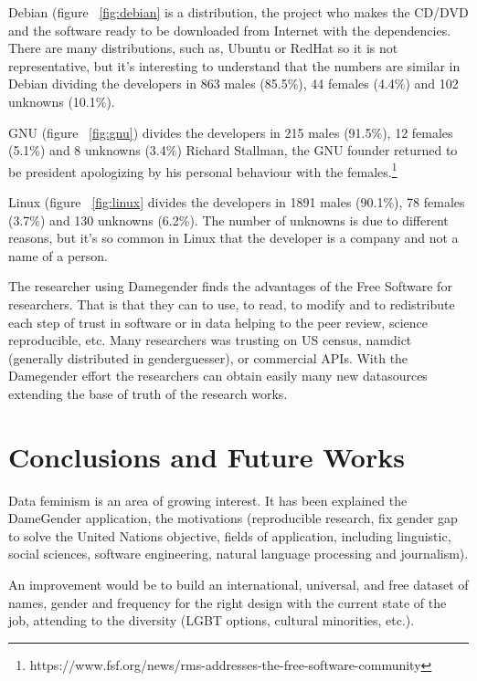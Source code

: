 \documentclass[a4paper]{article}
\begin{document}
Debian (figure ~\ref{fig:debian} is a distribution, the
project who makes the CD/DVD and the software ready to be
downloaded from Internet with the dependencies. There are
many distributions, such as, Ubuntu or RedHat
so it is not representative, but it's interesting to understand that
the numbers are similar in Debian dividing the developers in 863 males
(85.5\%), 44 females (4.4\%) and 102 unknowns (10.1\%).

GNU (figure ~\ref{fig:gnu}) divides the developers in 215
males (91.5\%), 12 females (5.1\%) and 8 unknowns (3.4\%)
Richard Stallman, the GNU founder returned to
be president apologizing by his personal behaviour with the
females.\footnote{https://www.fsf.org/news/rms-addresses-the-free-software-community}

Linux (figure ~\ref{fig:linux} divides the developers in 1891
males (90.1\%), 78 females (3.7\%) and 130 unknowns (6.2\%).
The number of unknowns is due to different reasons, but it's so
common in Linux that the developer is a company and not a name
of a person.

The researcher using Damegender finds the advantages of the Free Software
for researchers. That is that they can to use, to read, to modify and
to redistribute each step of trust in software or in data helping to the
peer review, science reproducible, etc. Many researchers
was trusting on US census, namdict (generally distributed in genderguesser),
or commercial APIs. With the Damegender effort the researchers can obtain easily 
many new datasources extending the base of truth of the research works.


\section{Conclusions and Future Works}
\label{sec:conclusions}

Data feminism\cite{d2020data} is an area of growing interest.
It has been explained the DameGender application,
the motivations (reproducible research, fix gender gap to solve the
United Nations objective, fields of application, including linguistic,
social sciences, software engineering, natural language processing and
journalism).

An improvement would be to build an international, universal, and free
dataset of names, gender and frequency for the right design with
the current state of the job, attending to the diversity (LGBT
options, cultural minorities, etc.).
\end{document}
